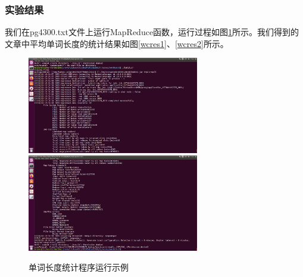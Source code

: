 \documentclass{article}
\begin{document}
\subsubsection{实验结果}
我们在pg4300.txt文件上运行MapReduce函数，运行过程如图\ref{wcrun}所示。我们得到的文章中平均单词长度的统计结果如图\ref{wcres1}、\ref{wcres2}所示。
\begin{figure}[htbp]
\centering
\includegraphics[width=7.5cm]{img/wc_running_head.png}
\includegraphics[width=7.5cm]{img/wc_running_end.png}
\caption{单词长度统计程序运行示例}
\label{wcrun}
\end{figure}
\end{document}
